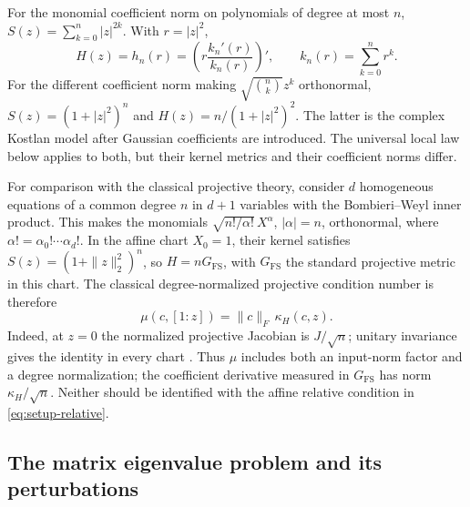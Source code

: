 \begin{example}\label{ex:setup-metrics}
For the monomial coefficient norm on polynomials of degree at most $n$,
$S(z)=\sum_{k=0}^n|z|^{2k}$. With $r=|z|^2$,
\[
 H(z)=h_n(r)=\left(r\frac{k_n'(r)}{k_n(r)}\right)',
 \qquad k_n(r)=\sum_{k=0}^n r^k.
\]
For the different coefficient norm making
$\sqrt{\binom nk}z^k$ orthonormal, $S(z)=(1+|z|^2)^n$ and
$H(z)=n/(1+|z|^2)^2$. The latter is the complex Kostlan model after Gaussian
coefficients are introduced. The universal local law below applies to both,
but their kernel metrics and their coefficient norms differ.
\end{example}

For comparison with the classical projective theory, consider $d$ homogeneous
equations of a common degree $n$ in $d+1$ variables with the
Bombieri--Weyl inner product. This makes the monomials
$\sqrt{n!/\alpha!}\,X^\alpha$, $|\alpha|=n$, orthonormal, where
$\alpha!=\alpha_0!\cdots\alpha_d!$.
In the affine chart $X_0=1$, their kernel satisfies
$S(z)=(1+\|z\|_2^2)^n$, so $H=nG_{\mathrm{FS}}$, with
$G_{\mathrm{FS}}$ the standard projective metric in this chart.
The classical degree-normalized projective condition number is therefore
\begin{equation}\label{eq:setup-classical-mu}
 \mu(c,[1:z])=\|c\|_F\,\kappa_H(c,z).
\end{equation}
Indeed, at $z=0$ the normalized projective Jacobian is $J/\sqrt n$;
unitary invariance gives the identity in every chart
\cite{shub1993geometric,burgisser2013condition}.
Thus $\mu$ includes both an input-norm factor and a degree normalization;
the coefficient derivative measured in $G_{\mathrm{FS}}$ has norm
$\kappa_H/\sqrt n$. Neither should be identified with the affine relative
condition in \eqref{eq:setup-relative}.

\subsection{The matrix eigenvalue problem and its perturbations}


